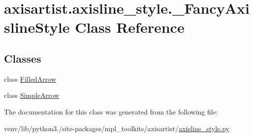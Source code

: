 \hypertarget{classaxisartist_1_1axisline__style_1_1__FancyAxislineStyle}{}\section{axisartist.\+axisline\+\_\+style.\+\_\+\+Fancy\+Axisline\+Style Class Reference}
\label{classaxisartist_1_1axisline__style_1_1__FancyAxislineStyle}
\subsection*{Classes}
\begin{DoxyCompactItemize}
\item 
class \hyperlink{classaxisartist_1_1axisline__style_1_1__FancyAxislineStyle_1_1FilledArrow}{Filled\+Arrow}
\item 
class \hyperlink{classaxisartist_1_1axisline__style_1_1__FancyAxislineStyle_1_1SimpleArrow}{Simple\+Arrow}
\end{DoxyCompactItemize}


The documentation for this class was generated from the following file\+:\begin{DoxyCompactItemize}
\item 
venv/lib/python3./site-\/packages/mpl\+\_\+toolkits/axisartist/\hyperlink{axisartist_2axisline__style_8py}{axisline\+\_\+style.\+py}\end{DoxyCompactItemize}
